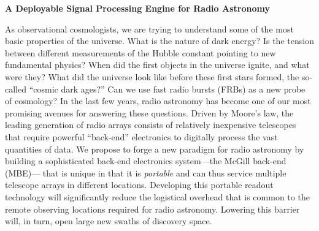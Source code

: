 \documentclass[11pt]{article}
\makeatletter
\newcommand{\mbe}{{\rm MBE}}
\def\section{\@startsection {section}{1}{\z@}{1.0ex plus 
1ex minus .2ex}{.2ex plus .2ex}{\large\bf}}
\makeatother
\begin{document}
\begin{center}
{\bf A Deployable Signal Processing Engine for Radio Astronomy}
\end{center}







As observational cosmologists, we are trying to understand some of the
most basic properties of the universe.  What is the nature of dark
energy?  Is the tension between different measurements of the Hubble
constant pointing to new fundamental physics?  When did the first
objects in the universe ignite, and what were they?  What did the
universe look like before these first stars formed, the so-called
``cosmic dark ages?''  Can we use fast radio bursts (FRBs) as a new
probe of cosmology?  In the last few years, radio astronomy has become
one of our most promising avenues for answering these questions.
Driven by Moore's law, the leading generation of radio arrays consists
of relatively inexpensive telescopes that require powerful
``back-end'' electronics to digitally process the vast quantities of
data. We propose to forge a new paradigm for radio astronomy by
building a sophisticated back-end electronics system---the McGill
back-end (\mbe)--- that is unique in that it is {\it portable} and can
thus service multiple telescope arrays in different locations.
Developing this portable readout technology will significantly reduce
the logistical overhead that is common to the remote observing
locations required for radio astronomy. Lowering this barrier will, in
turn, open large new swaths of discovery space.
\end{document}
